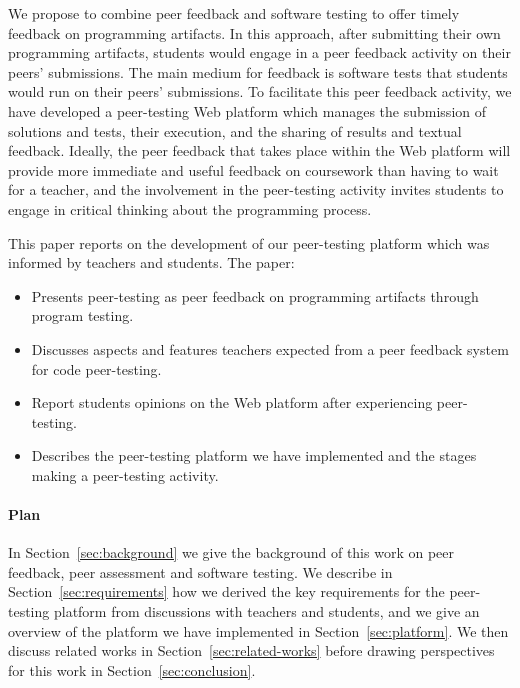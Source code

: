 \documentclass[sigplan,10pt,review]{acmart}\settopmatter{printfolios=true}
\begin{document}
We propose to combine peer feedback and software testing to offer
timely feedback on programming artifacts. In this approach, after
submitting their own programming artifacts, students would engage in a
peer feedback activity on their peers' submissions. The main medium
for feedback is software tests that students would run on their peers'
submissions.  To facilitate this peer feedback activity, we have
developed a peer-testing Web platform which manages the submission of
solutions and tests, their execution, and the sharing of results and
textual feedback.  Ideally, the peer feedback that takes place within
the Web platform will provide more immediate and useful feedback on
coursework than having to wait for a teacher, and the involvement in
the peer-testing activity invites students to engage in critical
thinking about the programming process.

This paper reports on the development of our peer-testing platform
which was informed by teachers and students.
The paper:
\begin{itemize}
\item Presents peer-testing as peer feedback on programming
  artifacts through program testing.
\item Discusses aspects and features teachers expected from a peer
  feedback system for code peer-testing.
\item Report students opinions on the Web platform after experiencing
  peer-testing.
\item Describes the peer-testing platform we have implemented and the
  stages making a peer-testing activity.
\end{itemize}

\paragraph{Plan}

In Section~\ref{sec:background} we give the background of this work on
peer feedback, peer assessment and software testing. We describe in
Section~\ref{sec:requirements} how we derived the key requirements for
the peer-testing platform from discussions with teachers and students,
and we give an overview of the platform we have implemented in
Section~\ref{sec:platform}.  We then discuss related works in
Section~\ref{sec:related-works} before drawing perspectives for this
work in Section~\ref{sec:conclusion}.

\end{document}
